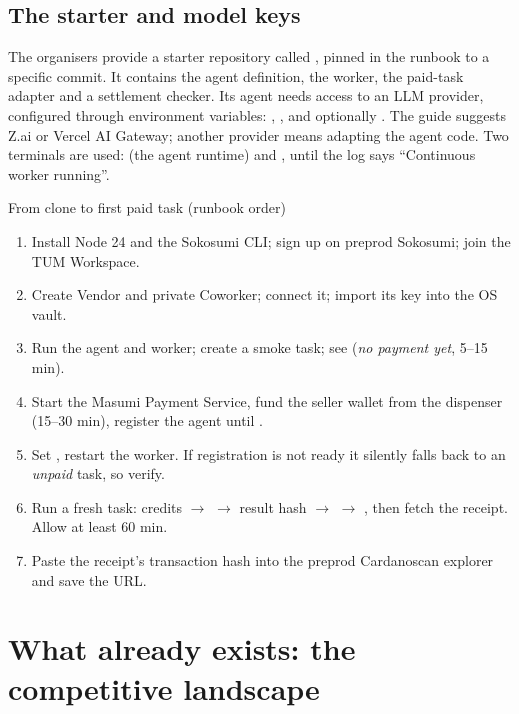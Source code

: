 \subsection{The starter and model keys}
The organisers provide a starter repository called , pinned in the runbook to a specific commit. It contains the agent definition, the worker, the paid-task adapter and a settlement checker. Its agent needs access to an LLM provider, configured through environment variables: , ,  and optionally . The guide suggests Z.ai or Vercel AI Gateway; another provider means adapting the agent code. Two terminals are used:  (the agent runtime) and , until the log says ``Continuous worker running''.

\begin{examplebox}{From clone to first paid task (runbook order)}
\begin{enumerate}[nosep]
  \item Install Node 24 and the Sokosumi CLI; sign up on preprod Sokosumi; join the TUM Workspace.
  \item Create Vendor and private Coworker; connect it; import its key into the OS vault.
  \item Run the agent and worker; create a smoke task; see  (\emph{no payment yet}, 5--15 min).
  \item Start the Masumi Payment Service, fund the seller wallet from the dispenser (15--30 min), register the agent until .
  \item Set , restart the worker. If registration is not ready it silently falls back to an \emph{unpaid} task, so verify.
  \item Run a fresh task: credits $\rightarrow$  $\rightarrow$ result hash $\rightarrow$  $\rightarrow$ , then fetch the receipt. Allow at least 60 min.
  \item Paste the receipt's transaction hash into the preprod Cardanoscan explorer and save the URL.
\end{enumerate}
\end{examplebox}

\section{What already exists: the competitive landscape}

